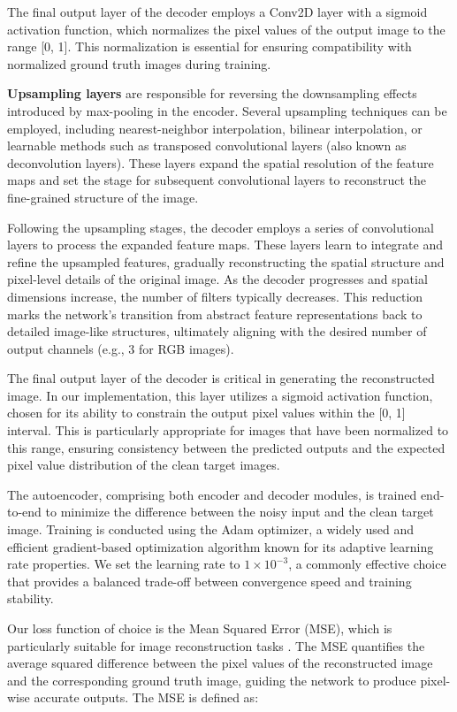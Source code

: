 \documentclass[12pt, conference]{IEEEtran}
\begin{document}
The final output layer of the decoder employs a Conv2D layer with a sigmoid activation function, which normalizes the pixel values of the output image to the range [0, 1]. This normalization is essential for ensuring compatibility with normalized ground truth images during training.

\textbf{Upsampling layers} are responsible for reversing the downsampling effects introduced by max-pooling in the encoder. Several upsampling techniques can be employed, including nearest-neighbor interpolation, bilinear interpolation, or learnable methods such as transposed convolutional layers (also known as deconvolution layers). These layers expand the spatial resolution of the feature maps and set the stage for subsequent convolutional layers to reconstruct the fine-grained structure of the image.

Following the upsampling stages, the decoder employs a series of convolutional layers to process the expanded feature maps. These layers learn to integrate and refine the upsampled features, gradually reconstructing the spatial structure and pixel-level details of the original image. As the decoder progresses and spatial dimensions increase, the number of filters typically decreases. This reduction marks the network’s transition from abstract feature representations back to detailed image-like structures, ultimately aligning with the desired number of output channels (e.g., 3 for RGB images).

The final output layer of the decoder is critical in generating the reconstructed image. In our implementation, this layer utilizes a sigmoid activation function, chosen for its ability to constrain the output pixel values within the [0, 1] interval. This is particularly appropriate for images that have been normalized to this range, ensuring consistency between the predicted outputs and the expected pixel value distribution of the clean target images.

The autoencoder, comprising both encoder and decoder modules, is trained end-to-end to minimize the difference between the noisy input and the clean target image. Training is conducted using the Adam optimizer, a widely used and efficient gradient-based optimization algorithm known for its adaptive learning rate properties. We set the learning rate to $1 \times 10^{-3}$, a commonly effective choice that provides a balanced trade-off between convergence speed and training stability.

Our loss function of choice is the Mean Squared Error (MSE), which is particularly suitable for image reconstruction tasks \cite{hore2010image}. The MSE quantifies the average squared difference between the pixel values of the reconstructed image and the corresponding ground truth image, guiding the network to produce pixel-wise accurate outputs. The MSE is defined as:
\end{document}
